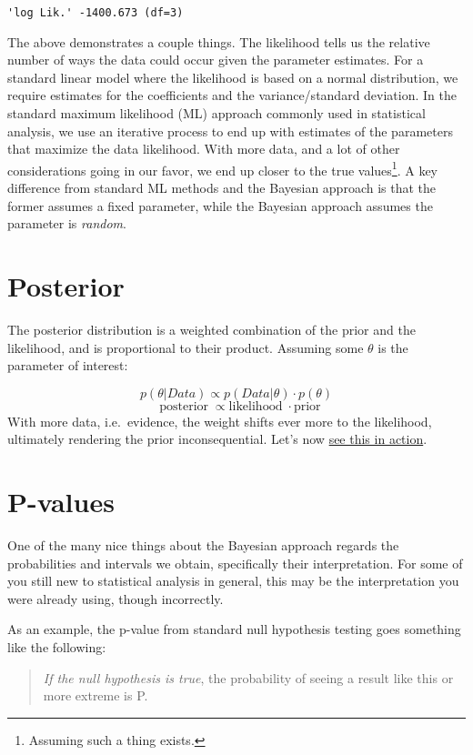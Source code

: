 \documentclass[]{book}
\let\rmarkdownfootnote\footnote%
\def\footnote{\protect\rmarkdownfootnote}
\begin{document}
\begin{verbatim}
'log Lik.' -1400.673 (df=3)
\end{verbatim}

The above demonstrates a couple things. The likelihood tells us the
relative number of ways the data could occur given the parameter
estimates. For a standard linear model where the likelihood is based on
a normal distribution, we require estimates for the coefficients and the
variance/standard deviation. In the standard maximum likelihood (ML)
approach commonly used in statistical analysis, we use an iterative
process to end up with estimates of the parameters that maximize the
data likelihood. With more data, and a lot of other considerations going
in our favor, we end up closer to the true values\footnote{Assuming such
  a thing exists.}. A key difference from standard ML methods and the
Bayesian approach is that the former assumes a fixed parameter, while
the Bayesian approach assumes the parameter is \emph{random}.

\section{Posterior}\label{posterior}

The {posterior} distribution is a weighted combination of the prior and
the likelihood, and is proportional to their product. Assuming some
\(\theta\) is the parameter of interest:

\[ p(\theta|Data) \propto p(Data|\theta) \cdot p(\theta) \]
\[ \;\;\mathrm{posterior} \;\propto \mathrm{likelihood} \;\!\cdot \mathrm{prior} \]
With more data, i.e.~evidence, the weight shifts ever more to the
likelihood, ultimately rendering the prior inconsequential. Let's now
\href{http://micl.shinyapps.io/prior2post/}{see this in action}.

\section{P-values}\label{p-values}

One of the many nice things about the Bayesian approach regards the
probabilities and intervals we obtain, specifically their
interpretation. For some of you still new to statistical analysis in
general, this may be the interpretation you were already using, though
incorrectly.

As an example, the p-value from standard {null hypothesis testing} goes
something like the following:

\begin{quote}
\emph{If the null hypothesis is true}, the probability of seeing a
result like this or more extreme is P.
\end{quote}
\end{document}
